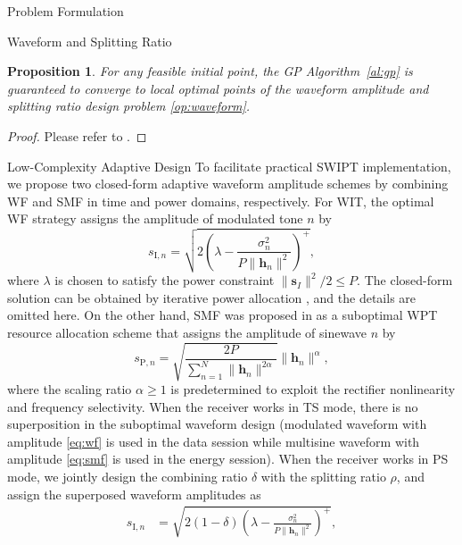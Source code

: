 \documentclass[journal]{IEEEtran}
\newtheorem{proposition}{Proposition}
\begin{document}
\begin{section}{Problem Formulation}
\begin{subsection}{Waveform and Splitting Ratio}
			\begin{proposition}\label{pr:gp}
				For any feasible initial point, the GP Algorithm~\ref{al:gp} is guaranteed to converge to local optimal points of the waveform amplitude and splitting ratio design problem \eqref{op:waveform}.
			\end{proposition}

			\begin{proof}\label{pf:gp}
				Please refer to \cite{Clerckx2016a,Clerckx2018b}.
			\end{proof}
		\end{subsection}


		\begin{subsection}{Low-Complexity Adaptive Design}
			To facilitate practical SWIPT implementation, we propose two closed-form adaptive waveform amplitude schemes by combining WF and SMF in time and power domains, respectively. For WIT, the optimal WF strategy assigns the amplitude of modulated tone $n$ by
			\begin{equation}\label{eq:wf}
				s_{\mathrm{I}, n} = \sqrt{2\left(\lambda - \frac{\sigma_n^2}{P \lVert{\boldsymbol{h}_n}\rVert^2}\right)^+},
			\end{equation}
			where $\lambda$ is chosen to satisfy the power constraint $\lVert{\boldsymbol{s}_I}\rVert^2 / 2 \le P$. The closed-form solution can be obtained by iterative power allocation \cite{Tse2005}, and the details are omitted here. On the other hand, SMF was proposed in \cite{Clerckx2017} as a suboptimal WPT resource allocation scheme that assigns the amplitude of sinewave $n$ by
			\begin{equation}\label{eq:smf}
				s_{\mathrm{P}, n} = \sqrt{\frac{2 P}{\sum_{n=1}^N \lVert{\boldsymbol{h}_n \rVert^{2 \alpha}}}}\lVert{\boldsymbol{h}_n}\rVert^\alpha,
			\end{equation}
			where the scaling ratio $\alpha \ge 1$ is predetermined to exploit the rectifier nonlinearity and frequency selectivity. When the receiver works in TS mode, there is no superposition in the suboptimal waveform design (modulated waveform with amplitude \eqref{eq:wf} is used in the data session while multisine waveform with amplitude \eqref{eq:smf} is used in the energy session). When the receiver works in PS mode, we jointly design the combining ratio $\delta$ with the splitting ratio $\rho$, and assign the superposed waveform amplitudes as
			\begin{align}
				s_{\mathrm{I}, n} &= \sqrt{2(1 - \delta)\left(\lambda - \frac{\sigma_n^2}{P \lVert{\boldsymbol{h}_n}\rVert^2}\right)^+}, \label{eq:s_i}\\

\end{align}
\end{subsection}
\end{section}
\end{document}
